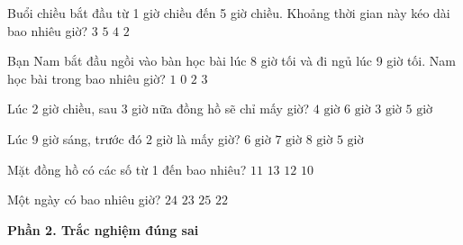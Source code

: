 \begin{ex} %
Buổi chiều bắt đầu từ 1 giờ chiều đến 5 giờ chiều. Khoảng thời gian này kéo dài bao nhiêu giờ?
\choice
{$3$}
{$5$}
{\True $4$}
{$2$}
\end{ex}

\begin{ex} %
Bạn Nam bắt đầu ngồi vào bàn học bài lúc 8 giờ tối và đi ngủ lúc 9 giờ tối. Nam học bài trong bao nhiêu giờ?
\choice
{\True $1$}
{$0$}
{$2$}
{$3$}
\end{ex}

\begin{ex} %
Lúc 2 giờ chiều, sau 3 giờ nữa đồng hồ sẽ chỉ mấy giờ?
\choice
{$4\text{ giờ}$}
{$6\text{ giờ}$}
{$3\text{ giờ}$}
{\True $5\text{ giờ}$}
\end{ex}

\begin{ex} %
Lúc 9 giờ sáng, trước đó 2 giờ là mấy giờ?
\choice
{$6\text{ giờ}$}
{\True $7\text{ giờ}$}
{$8\text{ giờ}$}
{$5\text{ giờ}$}
\end{ex}

\begin{ex} %
Mặt đồng hồ có các số từ 1 đến bao nhiêu?
\choice
{$11$}
{$13$}
{\True $12$}
{$10$}
\end{ex}

\begin{ex} %
Một ngày có bao nhiêu giờ?
\choice
{\True $24$}
{$23$}
{$25$}
{$22$}
\end{ex}

\textbf{Phần 2. Trắc nghiệm đúng sai}

